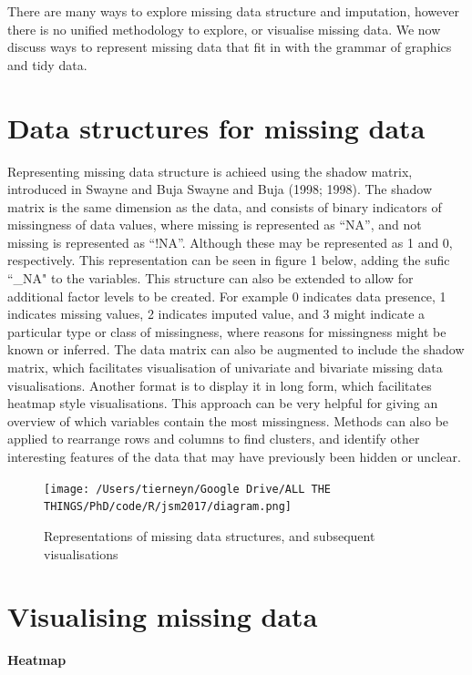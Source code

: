 \documentclass[]{article}
\begin{document}
There are many ways to explore missing data structure and imputation,
however there is no unified methodology to explore, or visualise missing
data. We now discuss ways to represent missing data that fit in with the
grammar of graphics and tidy data.

\section{Data structures for missing
data}\label{data-structures-for-missing-data}

Representing missing data structure is achieed using the shadow matrix,
introduced in Swayne and Buja Swayne and Buja (1998; 1998). The shadow
matrix is the same dimension as the data, and consists of binary
indicators of missingness of data values, where missing is represented
as ``NA'', and not missing is represented as ``!NA''. Although these may
be represented as 1 and 0, respectively. This representation can be seen
in figure 1 below, adding the sufic ``\_NA" to the variables. This
structure can also be extended to allow for additional factor levels to
be created. For example 0 indicates data presence, 1 indicates missing
values, 2 indicates imputed value, and 3 might indicate a particular
type or class of missingness, where reasons for missingness might be
known or inferred. The data matrix can also be augmented to include the
shadow matrix, which facilitates visualisation of univariate and
bivariate missing data visualisations. Another format is to display it
in long form, which facilitates heatmap style visualisations. This
approach can be very helpful for giving an overview of which variables
contain the most missingness. Methods can also be applied to rearrange
rows and columns to find clusters, and identify other interesting
features of the data that may have previously been hidden or unclear.

\begin{figure}[h]
\centering
\texttt{[image: /Users/tierneyn/Google Drive/ALL THE THINGS/PhD/code/R/jsm2017/diagram.png]}
\caption{Representations of missing data structures, and subsequent visualisations}
\end{figure}

\section{Visualising missing data}\label{visualising-missing-data}

\textbf{Heatmap}
\end{document}
